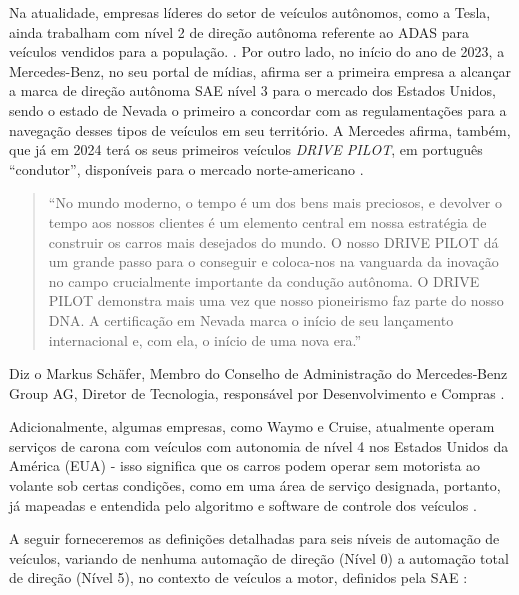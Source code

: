 Na atualidade, empresas líderes do setor de veículos autônomos, como a Tesla, ainda trabalham com nível 2 de direção autônoma referente ao ADAS para veículos vendidos para a população. \cite{4cenarios_ocidental}.
Por outro lado, no início do ano de 2023, a Mercedes-Benz, no seu portal de mídias, afirma ser a primeira empresa a alcançar a marca de direção autônoma SAE nível 3 para o mercado dos Estados Unidos, sendo o estado de Nevada o primeiro a concordar com as regulamentações para a navegação desses tipos de veículos em seu território. A Mercedes afirma, também, que já em 2024 terá os seus primeiros veículos \textit{DRIVE PILOT}, em português “condutor”, disponíveis para o mercado norte-americano \cite{mercedes3}.

\begin{quote}
“No mundo moderno, o tempo é um dos bens mais preciosos, e devolver o tempo aos nossos clientes é um elemento central em nossa estratégia de construir os carros mais desejados do mundo. O nosso DRIVE PILOT dá um grande passo para o conseguir e coloca-nos na vanguarda da inovação no campo crucialmente importante da condução autônoma. O DRIVE PILOT demonstra mais uma vez que nosso pioneirismo faz parte do nosso DNA. A certificação em Nevada marca o início de seu lançamento internacional e, com ela, o início de uma nova era.”

\end{quote}
Diz o Markus Schäfer, Membro do Conselho de Administração do Mercedes‑Benz Group AG, Diretor de Tecnologia, responsável por Desenvolvimento e Compras \cite{mercedes3}.

Adicionalmente, algumas empresas, como Waymo e Cruise, atualmente operam serviços de carona com veículos com autonomia de nível 4 nos Estados Unidos da América (EUA) - isso significa que os carros podem operar sem motorista ao volante sob certas condições, como em uma área de serviço designada, portanto, já mapeadas e entendida pelo algoritmo e software de controle dos veículos \cite{Houser2023-dn}.



A seguir forneceremos as definições detalhadas para seis níveis de automação de veículos, variando de nenhuma automação de direção (Nível 0) a automação total de direção (Nível 5), no contexto de veículos a motor, definidos pela SAE \cite{SAE}:

